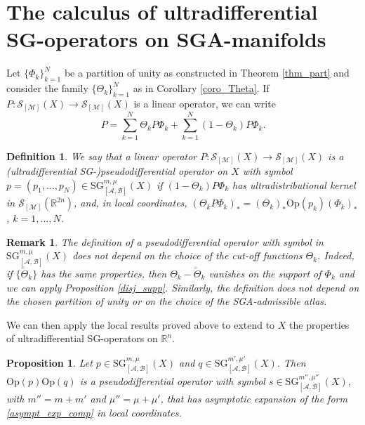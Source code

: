 \documentclass[11pt,reqno]{amsart}
\numberwithin{equation}{section}
\newtheorem{definition}[theorem]{Definition}
\newtheorem{proposition}[theorem]{Proposition}
\newtheorem{remark}[theorem]{Remark}
\newcommand{\SG}{{\mathrm{SG}}}
\newcommand{\M}{{\mathcal{M}}} %
\newcommand{\A}{{\mathcal{A}}} %
\newcommand{\B}{{\mathcal{B}}} %
\begin{document}

\section{The calculus of ultradifferential SG-operators on SGA-manifolds}\label{sec:SGABmf}

Let $\{\Phi_k\}_{k=1}^N$ be a partition of unity as constructed in Theorem \ref{thm_part} and consider the family $\{\Theta_k\}_{k=1}^N$ 
as in Corollary \ref{coro_Theta}. If $P:\mathcal{S}_{[\M]}(X)\to \mathcal{S}_{[\M]}(X)$ is a linear operator, we can write
%
\[P = \sum_{k=1}^N\Theta_k P\Phi_k + \sum_{k=1}^N(1-\Theta_k) P\Phi_k.\]


\begin{definition}
	We say that a linear operator $P:\mathcal{S}_{[\M]}(X)\to \mathcal{S}_{[\M]}(X)$ is a (ultradifferential SG-)pseudodifferential operator on $X$
	with symbol $p=(p_1,\dots,p_N)\in {\SG}_{[\A,\B]}^{m,\mu}(X)$ if $(1-\Theta_k)P\Phi_k$ has ultradistributional kernel 
	in $\mathcal{S}_{[\M]}(\mathbb{R}^{2n})$, and, in local coordinates, $(\Theta_k P \Phi_k)_* = (\Theta_k)_*\mathrm{Op}(p_k)(\Phi_k)_*$, $k=1,\dots,N$.
\end{definition}


\begin{remark}
	The definition of a pseudodifferential operator with symbol in ${\SG}_{[\A,\B]}^{m,\mu}(X)$ does not depend on the choice of the cut-off functions
	$\Theta_k$. Indeed, if $\{\tilde{\Theta}_k\}$ has the same properties, then $\Theta_k-\tilde{\Theta}_k$ vanishes on the support of 
	$\Phi_k$ and we can apply Proposition \ref{disj_supp}. Similarly, the definition does not depend on the chosen partition of unity or on the choice
	of the SGA-admissible atlas.
\end{remark}

We can then apply the local results proved above to extend to $X$ the properties of ultradifferential SG-operators on $\mathbb{R}^n$.

\begin{proposition}
	Let $p\in {\SG}_{[\A,\B]}^{m,\mu}(X)$ and $q\in {\SG}_{[\A,\B]}^{m',\mu'}(X)$. 
	Then $\mathrm{Op}(p)\mathrm{Op}(q)$ is a pseudodifferential operator with symbol $s\in {\SG}_{[\A,\B]}^{m'',\mu''}(X)$, 
	with $m''=m+m'$ and $\mu''=\mu+\mu'$, that has asymptotic expansion of the form \eqref{asympt_exp_comp} in local coordinates.
\end{proposition}
\end{document}
